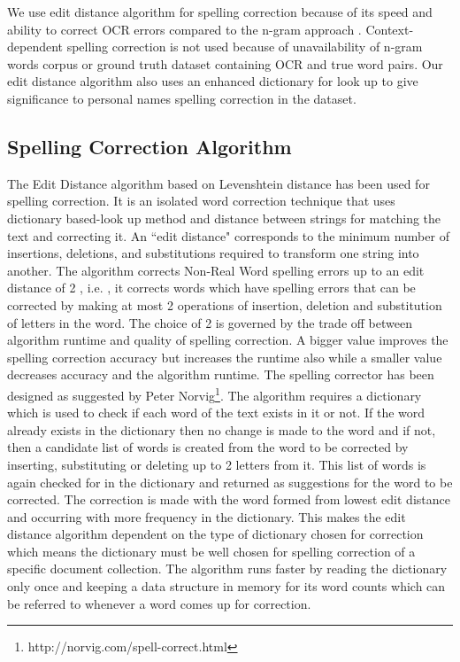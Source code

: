 \documentclass[letterpaper,11pt]{report}
\begin{document}
 We use edit distance algorithm for spelling correction because of its speed and ability to correct OCR errors compared to the n-gram approach \cite{chattopadhyaya2013fast}. Context-dependent spelling correction is not used because of unavailability of n-gram words corpus or ground truth dataset containing OCR and true word pairs. Our edit distance algorithm also uses an enhanced dictionary for look up to give significance to personal names spelling correction in the dataset. 


\subsection{Spelling Correction Algorithm}
\label{spell:algo}

The Edit Distance algorithm based on Levenshtein distance\cite{levenshtein1966binary} has been used for spelling correction. It is an isolated word correction technique that uses dictionary based-look up method and distance between strings for matching the text and correcting it. An ``edit distance" corresponds to the minimum number of insertions, deletions, and substitutions required to transform one string into another. The algorithm corrects Non-Real Word spelling errors up to an edit distance of 2 , i.e. , it corrects words which have spelling errors that can be corrected by making at most 2 operations of insertion, deletion and substitution of letters in the word. The choice of 2 is governed by the trade off between algorithm runtime and quality of spelling correction. A bigger value improves the spelling correction accuracy but increases the runtime also while a smaller value decreases accuracy and the algorithm runtime.
The spelling corrector has been designed as suggested by Peter Norvig\footnote{ http://norvig.com/spell-correct.html}. The algorithm requires a dictionary which is used to check if each word of the text exists in it or not. If the word already exists in the dictionary then no change is made to the word and if not, then a candidate list of words is created from the word to be corrected by inserting, substituting or deleting up to 2 letters from it.  This list of words is again checked for in the dictionary and returned as suggestions for the word to be corrected. The correction is made with the word formed from lowest edit distance and occurring with more frequency in the dictionary. This makes the edit distance algorithm dependent on the type of dictionary chosen for correction which means the dictionary must be well chosen for spelling correction of a specific document collection. The algorithm runs faster by reading the dictionary only once and keeping a data structure in memory for its word counts which can be referred to whenever a word comes up for correction.
\end{document}
